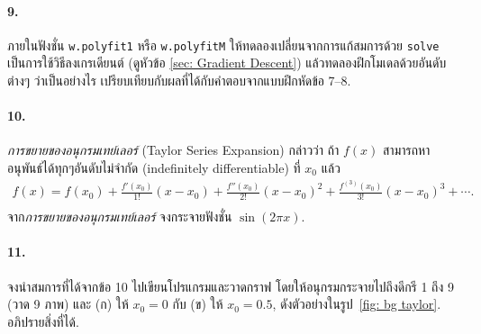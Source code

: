 \paragraph{9.} ภายในฟังชั่น \texttt{w.polyfit1} หรือ \texttt{w.polyfitM} ให้ทดลองเปลี่ยนจากการแก้สมการด้วย \texttt{solve} เป็นการใช้วิธีลงเกรเดียนต์ (ดูหัวข้อ \ref{sec: Gradient Descent}) แล้วทดลองฝึกโมเดลด้วยอันดับต่างๆ ว่าเป็นอย่างไร เปรียบเทียบกับผลที่ได้กับคำตอบจากแบบฝึกหัดข้อ 7--8.

\paragraph{10.} \textit{การขยายของอนุกรมเทย์เลอร์} (Taylor Series Expansion) กล่าวว่า 
ถ้า $f(x)$ สามารถหาอนุพันธ์ได้ทุกๆอันดับไม่จำกัด (indefinitely differentiable) ที่ $x_0$ แล้ว
\begin{eqnarray}
   f(x) = f(x_0) + \frac{f'(x_0)}{1!}(x - x_0) + \frac{f''(x_0)}{2!}(x - x_0)^2  + \frac{f^{(3)}(x_0)}{3!}(x - x_0)^3 + \cdots.
\nonumber \\
\label{eq: Taylor}
\end{eqnarray}
 
จาก\textit{การขยายของอนุกรมเทย์เลอร์} จงกระจายฟังชั่น $\sin(2 \pi x)$.

\paragraph{11.} จงนำสมการที่ได้จากข้อ 10 ไปเขียนโปรแกรมและวาดกราฟ 
โดยให้อนุกรมกระจายไปถึงดีกรี 1 ถึง 9 (วาด 9 ภาพ) 
และ (ก) ให้ $x_0 = 0$ กับ (ข) ให้ $x_0 = 0.5$, ดังตัวอย่างในรูป~\ref{fig: bg taylor}.
อภิปรายสิ่งที่ได้.

